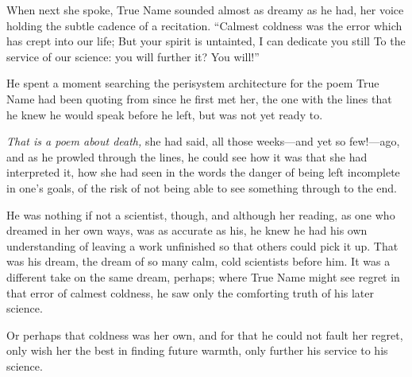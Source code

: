 When next she spoke, True Name sounded almost as dreamy as he had, her voice holding the subtle cadence of a recitation. ``Calmest coldness was the error which has crept into our life; But your spirit is untainted, I can dedicate you still To the service of our science: you will further it? You will!''

He spent a moment searching the perisystem architecture for the poem True Name had been quoting from since he first met her, the one with the lines that he knew he would speak before he left, but was not yet ready to.

\emph{That is a poem about death,} she had said, all those weeks—and yet so few!—ago, and as he prowled through the lines, he could see how it was that she had interpreted it, how she had seen in the words the danger of being left incomplete in one's goals, of the risk of not being able to see something through to the end.

He was nothing if not a scientist, though, and although her reading, as one who dreamed in her own ways, was as accurate as his, he knew he had his own understanding of leaving a work unfinished so that others could pick it up. That was his dream, the dream of so many calm, cold scientists before him. It was a different take on the same dream, perhaps; where True Name might see regret in that error of calmest coldness, he saw only the comforting truth of his later science.

Or perhaps that coldness was her own, and for that he could not fault her regret, only wish her the best in finding future warmth, only further his service to his science.

